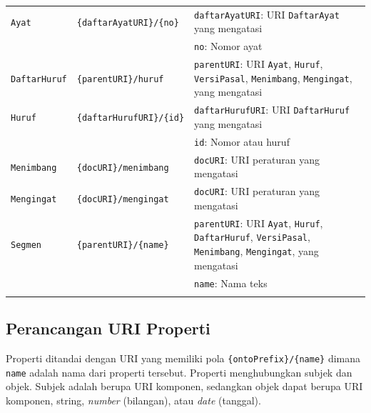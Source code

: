 \begin{longtable}[c]{@{}lll@{}}
\texttt{Ayat} & \texttt{\{daftarAyatURI\}/\{no\}} &
\texttt{daftarAyatURI}: URI \texttt{DaftarAyat} yang mengatasi
\\\addlinespace
& & \texttt{no}: Nomor ayat
\\\addlinespace
\texttt{DaftarHuruf} & \texttt{\{parentURI\}/huruf} &
\texttt{parentURI}: URI \texttt{Ayat}, \texttt{Huruf},
\texttt{VersiPasal}, \texttt{Menimbang}, \texttt{Mengingat}, yang
mengatasi
\\\addlinespace
\texttt{Huruf} & \texttt{\{daftarHurufURI\}/\{id\}} &
\texttt{daftarHurufURI}: URI \texttt{DaftarHuruf} yang mengatasi
\\\addlinespace
& & \texttt{id}: Nomor atau huruf
\\\addlinespace
\texttt{Menimbang} & \texttt{\{docURI\}/menimbang} & \texttt{docURI}:
URI peraturan yang mengatasi
\\\addlinespace
\texttt{Mengingat} & \texttt{\{docURI\}/mengingat} & \texttt{docURI}:
URI peraturan yang mengatasi
\\\addlinespace
\texttt{Segmen} & \texttt{\{parentURI\}/\{name\}} & \texttt{parentURI}:
URI \texttt{Ayat}, \texttt{Huruf}, \texttt{DaftarHuruf},
\texttt{VersiPasal}, \texttt{Menimbang}, \texttt{Mengingat}, yang
mengatasi
\\\addlinespace
& & \texttt{name}: Nama teks
\\\addlinespace
\bottomrule
\end{longtable}

\subsection{Perancangan URI Properti}\label{perancangan-uri-properti}

Properti ditandai dengan URI yang memiliki pola
\texttt{\{ontoPrefix\}/\{name\}} dimana \texttt{name} adalah nama dari
properti tersebut. Properti menghubungkan subjek dan objek. Subjek
adalah berupa URI komponen, sedangkan objek dapat berupa URI komponen,
string, \emph{number} (bilangan), atau \emph{date} (tanggal).

